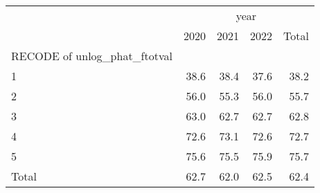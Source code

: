 \begin{tabular}{lllll}
\cline{1-5}
\multicolumn{1}{c}{} &
  \multicolumn{4}{|c}{year} \\
\multicolumn{1}{c}{} &
  \multicolumn{1}{|r}{2020} &
  \multicolumn{1}{r}{2021} &
  \multicolumn{1}{r}{2022} &
  \multicolumn{1}{r}{Total} \\
\cline{1-5}
\multicolumn{1}{l}{RECODE of unlog\_phat\_ftotval} &
  \multicolumn{1}{|r}{} &
  \multicolumn{1}{r}{} &
  \multicolumn{1}{r}{} &
  \multicolumn{1}{r}{} \\
\multicolumn{1}{l}{\hspace{1em}1} &
  \multicolumn{1}{|r}{38.6} &
  \multicolumn{1}{r}{38.4} &
  \multicolumn{1}{r}{37.6} &
  \multicolumn{1}{r}{38.2} \\
\multicolumn{1}{l}{\hspace{1em}2} &
  \multicolumn{1}{|r}{56.0} &
  \multicolumn{1}{r}{55.3} &
  \multicolumn{1}{r}{56.0} &
  \multicolumn{1}{r}{55.7} \\
\multicolumn{1}{l}{\hspace{1em}3} &
  \multicolumn{1}{|r}{63.0} &
  \multicolumn{1}{r}{62.7} &
  \multicolumn{1}{r}{62.7} &
  \multicolumn{1}{r}{62.8} \\
\multicolumn{1}{l}{\hspace{1em}4} &
  \multicolumn{1}{|r}{72.6} &
  \multicolumn{1}{r}{73.1} &
  \multicolumn{1}{r}{72.6} &
  \multicolumn{1}{r}{72.7} \\
\multicolumn{1}{l}{\hspace{1em}5} &
  \multicolumn{1}{|r}{75.6} &
  \multicolumn{1}{r}{75.5} &
  \multicolumn{1}{r}{75.9} &
  \multicolumn{1}{r}{75.7} \\
\multicolumn{1}{l}{\hspace{1em}Total} &
  \multicolumn{1}{|r}{62.7} &
  \multicolumn{1}{r}{62.0} &
  \multicolumn{1}{r}{62.5} &
  \multicolumn{1}{r}{62.4} \\
\cline{1-5}
\end{tabular}
